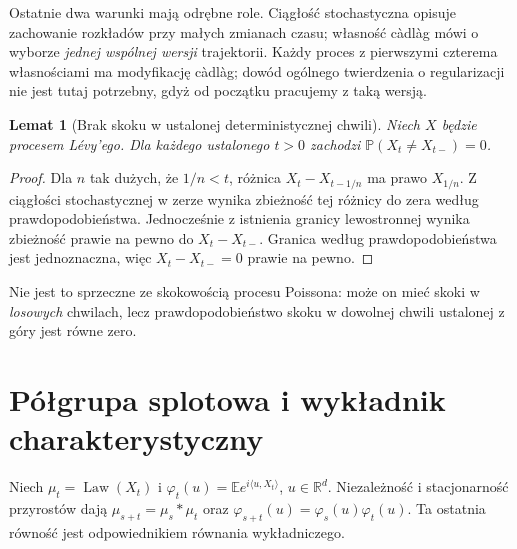 \documentclass[11pt,a4paper,oneside]{report}
\numberwithin{equation}{chapter}
\theoremstyle{plain}
\newtheorem{lemat}[twierdzenie]{Lemat}
\theoremstyle{definition}
\theoremstyle{remark}
\newcommand{\R}{\mathbb{R}}
\newcommand{\Prob}{\mathbb{P}}
\newcommand{\E}{\mathbb{E}}
\newcommand{\Law}{\operatorname{Law}}
\begin{document}
Ostatnie dwa warunki mają odrębne role. Ciągłość stochastyczna
opisuje zachowanie rozkładów przy małych zmianach czasu;
własność càdlàg mówi o wyborze \emph{jednej wspólnej wersji}
trajektorii. Każdy proces z pierwszymi czterema własnościami
ma modyfikację càdlàg; dowód ogólnego twierdzenia o regularizacji
nie jest tutaj potrzebny, gdyż od początku pracujemy z taką wersją.

\begin{lemat}[Brak skoku w ustalonej deterministycznej chwili]
\label{lem:levy-no-fixed-jumps}
Niech $X$ będzie procesem Lévy'ego. Dla każdego ustalonego
$t>0$ zachodzi $\Prob(X_t\ne X_{t-})=0$.
\end{lemat}
\begin{proof}
Dla $n$ tak dużych, że $1/n<t$, różnica
$X_t-X_{t-1/n}$ ma prawo $X_{1/n}$. Z ciągłości
stochastycznej w zerze wynika zbieżność tej różnicy do
zera według prawdopodobieństwa. Jednocześnie z istnienia
granicy lewostronnej wynika zbieżność prawie na pewno do
$X_t-X_{t-}$. Granica według prawdopodobieństwa jest
jednoznaczna, więc $X_t-X_{t-}=0$ prawie na pewno.
\end{proof}

Nie jest to sprzeczne ze skokowością procesu Poissona:
może on mieć skoki w \emph{losowych} chwilach, lecz
prawdopodobieństwo skoku w dowolnej chwili ustalonej z góry
jest równe zero.

\section{Półgrupa splotowa i wykładnik charakterystyczny}

Niech $\mu_t=\Law(X_t)$ i
$\varphi_t(u)=\E e^{i\langle u,X_t\rangle}$,
$u\in\R^d$. Niezależność i stacjonarność przyrostów dają
$\mu_{s+t}=\mu_s*\mu_t$ oraz
$\varphi_{s+t}(u)=\varphi_s(u)\varphi_t(u)$.
Ta ostatnia równość jest odpowiednikiem równania wykładniczego.
\end{document}
